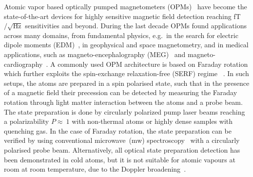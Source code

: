 \documentclass[%
reprint,
 amsmath,amssymb,
 aps,
floatfix,
]{revtex4-1}
\begin{document}
Atomic vapor based optically pumped magnetometers (OPMs)~\cite{OPM1,OPM2} have become the state-of-the-art devices for highly sensitive magnetic field detection reaching fT$/\sqrt{\mathrm{Hz}}$ sensitivities and beyond. During the last decade OPMs found applications across many domains, from fundamental physics, e.g.\ in the search for electric dipole moments (EDM)~\cite{edm1,edm2}, in geophysical and space magnetometry, and  in medical applications, such as magneto-encephalography (MEG)~\cite{meg1,meg2} and magneto-cardiography~\cite{mcg0,mcg1,mcg2}. 
A commonly used OPM architecture is based on Faraday rotation which further exploits the spin-exchange relaxation-free (SERF) regime ~\cite{Romalis2002,Romalis2010}. In such setups, the atoms are prepared in a spin polarised state, such that in the presence of a magnetic field their precession can be detected by measuring the Faraday rotation through light matter interaction between the atoms and a probe beam. The state preparation is done by circularly polarized pump laser beams reaching a polarizability $P\approx~1$ with non-thermal atoms or highly dense  samples with quenching gas. In the case of Faraday rotation, the state preparation can be verified by using conventional microwave~(mw) spectroscopy~\cite{Wieman93} with a circularly polarised probe beam.
Alternatively, all optical state preparation detection has been demonstrated in cold atoms, but it is not suitable for atomic vapours at room at room temperature, due to the Doppler broadening~\cite{Wang07}.
\end{document}
